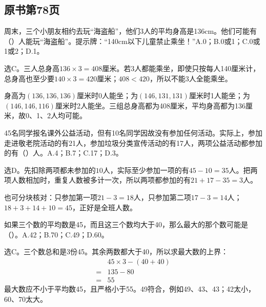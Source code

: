 \subsection*{原书第78页}

周末，三个小朋友相约去玩“海盗船”，他们3人的平均身高是136cm。他们可能有（\hspace{1.8em}）人能玩“海盗船”。提示牌：“140cm以下儿童禁止乘坐！”A.0；B.0或1；C.0或1或2；D.1。\par
{}
\begin{BookAnswer}
选C。三人总身高\(136\times3=408\)厘米。若3人都能乘坐，即使只按每人140厘米计，总身高也至少要\(140\times3=420\)厘米；\allowbreak{}\(408<420\)，所以不能3人全能乘坐。\par 身高为\((136,136,136)\)厘米时0人能坐；为\((146,131,131)\)厘米时1人能坐；为\((146,146,116)\)厘米时2人能坐。三组总身高都为408厘米，平均身高都为136厘米，故0、1、2人均可能。
\end{BookAnswer}

45名同学报名课外公益活动，但有10名同学因故没有参加任何活动。实际上，参加走进敬老院活动的有21人，参加垃圾分类宣传活动的有17人，两项公益活动都参加的有（\hspace{1.8em}）人。A.4；B.7；C.17；D.3。\par
\begin{BookAnswer}
选D。先扣除两项都未参加的\(10\)人，实际至少参加一项的有\(45-10=35\)人。把两项人数相加时，重复人数被多计一次，所以两项都参加的有\(21+17-35=3\)人。\par 也可分块核对：只参加第一项\(21-3=18\)人，只参加第二项\(17-3=14\)人；\allowbreak{}\(18+3+14+10=45\)，正好是全班人数。
\end{BookAnswer}

如果三个数的平均数是45，而且这三个数均大于40，那么最大的那个数可能是（\hspace{1.8em}）。A.42；B.70；C.49；D.60。\par
\begin{BookAnswer}
选C。三个数总和是3份45。其余两数都大于40，所以求最大数的上界：\[\begin{aligned}&45\times3-(40+40)\\={}&135-80\\={}&55\end{aligned}\]最大数应不小于平均数45，且严格小于55。49符合，例如49、43、43；42太小，60、70太大。
\end{BookAnswer}

